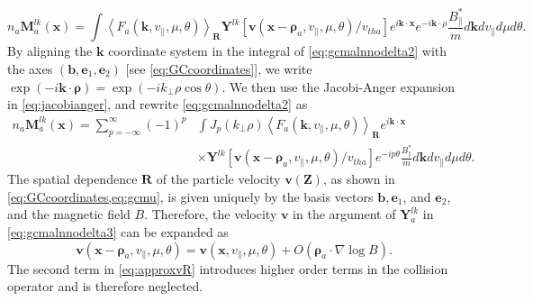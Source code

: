 %
\begin{equation}
    n_a \mathbf M_a^{lk}(\mathbf x)= \int \left<F_a(\mathbf k, v_\parallel, \mu,\theta) \right>_{\mathbf R}\mathbf Y^{lk}[\mathbf v(\mathbf x-{\mathbf \rho}_a, v_\parallel, \mu, \theta)/v_{tha}] e^{i \mathbf k \cdot \mathbf x}e^{-i \mathbf k \cdot \rho} \frac{B_{\parallel}^*}{m}d \mathbf k dv_\parallel d\mu d\theta.
\label{eq:gcmalnnodelta2}
\end{equation}
%
By aligning the $\mathbf k$ coordinate system in the integral of \cref{eq:gcmalnnodelta2} with the axes $(\mathbf b, \mathbf e_1, \mathbf e_2)$ [see \cref{eq:GCcoordinates}], we write $\exp(-i \mathbf k \cdot \mathbf \rho)=\exp(-i k_\perp \rho \cos \theta)$.
%
We then use the Jacobi-Anger expansion in \cref{eq:jacobianger}, and rewrite \cref{eq:gcmalnnodelta2} as
%
\begin{equation}
\begin{split}
    n_a \mathbf M_a^{lk}(\mathbf x)= \sum_{p=-\infty}^{\infty}(-1)^p &\int J_p(k_\perp \rho)\left<F_a(\mathbf k, v_\parallel, \mu,\theta)\right>_{\mathbf R}  e^{i \mathbf k \cdot \mathbf x}\\
    &\times\mathbf Y^{lk}[\mathbf v(\mathbf x-{\mathbf \rho}_a, v_\parallel, \mu, \theta)/v_{tha}] e^{-ip\theta} \frac{B_{\parallel}^*}{m}d \mathbf k dv_\parallel d\mu d\theta.
\end{split}
\label{eq:gcmalnnodelta3}
\end{equation}
%
The spatial dependence $\mathbf R$ of the particle velocity $\mathbf v(\mathbf Z)$, as shown in \cref{eq:GCcoordinates,eq:gcmu}, is given uniquely by the basis vectors $\mathbf b, \mathbf e_1$, and $\mathbf e_2$, and the magnetic field $B$.
%
Therefore, the velocity $\mathbf v$ in the argument of $\mathbf Y_a^{lk}$ in \cref{eq:gcmalnnodelta3} can be expanded as
%
\begin{equation}
    \mathbf v(\mathbf x-{\mathbf \rho}_a, v_\parallel, \mu, \theta) = \mathbf v(\mathbf x, v_\parallel, \mu, \theta) + O({\mathbf \rho}_a \cdot \nabla \log B).
\label{eq:approxvR}
\end{equation}
%
The second term in \cref{eq:approxvR} introduces higher order terms in the collision operator and is therefore neglected.

